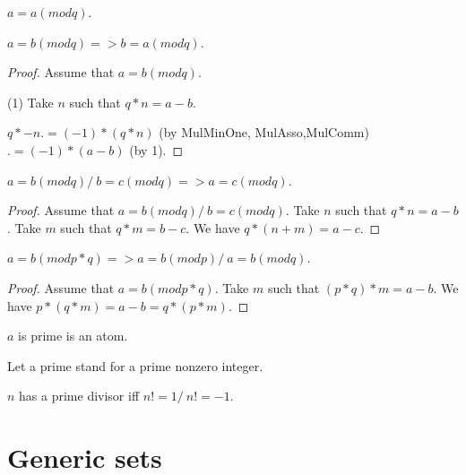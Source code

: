 \documentclass{document}
\begin{document}
\begin{forthel}
    \begin{lemma}[EquModRef]
      $a = a (mod q)$.
    \end{lemma}

    \begin{lemma}[EquModSym]
      $a = b (mod q) => b = a (mod q)$.
    \end{lemma}
    \begin{proof}
      Assume that $a = b (mod q)$.

      (1) Take $n$ such that $q * n = a - b$.

      $q * -n .= (-1) * (q * n)$ (by MulMinOne, MulAsso,MulComm) $.= (-1) * (a - b)$ (by 1).
    \end{proof}

    \begin{lemma}[EquModTrn]
      $a = b (mod q) /\ b = c (mod q) => a = c (mod q)$.
    \end{lemma}
    \begin{proof}
      Assume that $a = b (mod q) /\ b = c (mod q)$. Take $n$ such that $q * n = a - b$. Take $m$ such that $q * m = b - c$. We have $q * (n + m) = a - c$.
    \end{proof}

    \begin{lemma}[EquModMul]
      $a = b (mod p * q) => a = b (mod p) /\ a = b (mod q)$.
    \end{lemma}
    \begin{proof}
      Assume that $a = b (mod p * q)$. Take $m$ such that $(p * q) * m = a - b$. We have $p * (q * m) = a - b = q * (p * m)$.
    \end{proof}

    \begin{signature}[Prime]
      $a$ is prime is an atom.
    \end{signature}

    Let a prime stand for a prime nonzero integer.

    \begin{axiom}[PrimeDivisor]
      $n$ has a prime divisor iff $n != 1 /\ n != -1$.
    \end{axiom}
  \end{forthel}


  \section{Generic sets}
\end{document}

